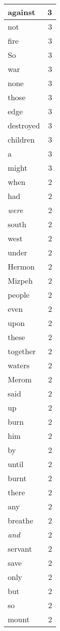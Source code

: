\begin{center}
\begin{longtable}{l|r}
against & 3 \\ \hline
not & 3 \\ \hline
fire & 3 \\ \hline
So & 3 \\ \hline
war & 3 \\ \hline
none & 3 \\ \hline
those & 3 \\ \hline
edge & 3 \\ \hline
destroyed & 3 \\ \hline
children & 3 \\ \hline
a & 3 \\ \hline
might & 3 \\ \hline
when & 2 \\ \hline
had & 2 \\ \hline
\emph{were} & 2 \\ \hline
south & 2 \\ \hline
west & 2 \\ \hline
under & 2 \\ \hline
Hermon & 2 \\ \hline
Mizpeh & 2 \\ \hline
people & 2 \\ \hline
even & 2 \\ \hline
upon & 2 \\ \hline
these & 2 \\ \hline
together & 2 \\ \hline
waters & 2 \\ \hline
Merom & 2 \\ \hline
said & 2 \\ \hline
up & 2 \\ \hline
burn & 2 \\ \hline
him & 2 \\ \hline
by & 2 \\ \hline
until & 2 \\ \hline
burnt & 2 \\ \hline
there & 2 \\ \hline
any & 2 \\ \hline
breathe & 2 \\ \hline
\emph{and} & 2 \\ \hline
servant & 2 \\ \hline
save & 2 \\ \hline
only & 2 \\ \hline
but & 2 \\ \hline
so & 2 \\ \hline
mount & 2 \\ \hline

\end{longtable}
\end{center}
